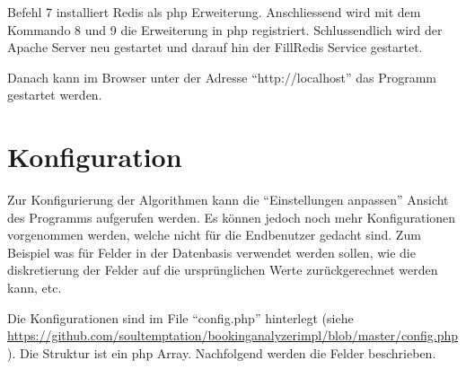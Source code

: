 Befehl 7 installiert Redis als \gls{php} Erweiterung. Anschliessend wird mit dem Kommando 8 und 9 die Erweiterung in \gls{php} registriert. Schlussendlich wird der Apache Server neu gestartet und darauf hin der FillRedis Service gestartet.

Danach kann im Browser unter der Adresse "`http://localhost"' das Programm gestartet werden.

\section{Konfiguration}
\label{sec:proofofconcept:konfiguration}
Zur Konfigurierung der Algorithmen kann die "`Einstellungen anpassen"' Ansicht des Programms aufgerufen werden. Es können jedoch noch mehr Konfigurationen vorgenommen werden, welche nicht für die Endbenutzer gedacht sind. Zum Beispiel was für Felder in der Datenbasis verwendet werden sollen, wie die diskretierung der Felder auf die ursprünglichen Werte zurückgerechnet werden kann, etc. 

Die Konfigurationen sind im File "`config.php"' hinterlegt (siehe \url{https://github.com/soultemptation/bookinganalyzerimpl/blob/master/config.php}). Die Struktur ist ein \gls{php} Array. Nachfolgend werden die Felder beschrieben.


